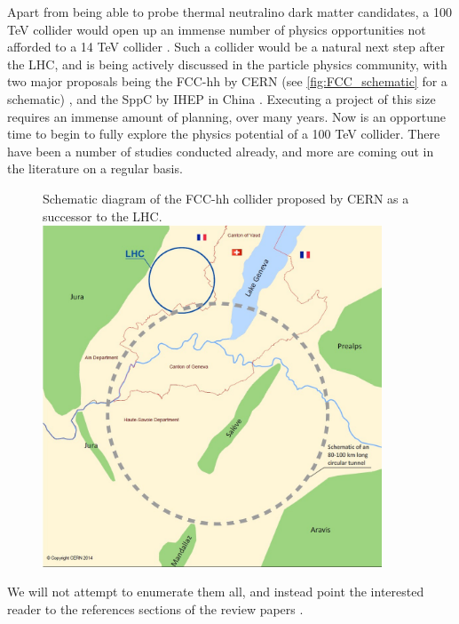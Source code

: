Apart from being able to probe thermal neutralino dark matter candidates, a 100 TeV collider would open up an immense number of physics opportunities not afforded to a 14 TeV collider \citep{Arkani-Hamed2015}. 
Such a collider would be a natural next step after the LHC, and is being actively discussed in the particle physics community, with two major proposals being the FCC-hh by CERN (see \autoref{fig:FCC_schematic} for a schematic) \citep{FCC-hh}, and the SppC by IHEP in China \citep{CEPC}. Executing a project of this size requires an immense amount of planning, over many years. Now is an opportune time to begin to fully explore the physics potential of a 100 TeV collider. There have been a number of studies conducted already, and more are coming out in the literature on a regular basis. 

\begin{figure}[h]
  \begin{sidecaption}
    {Schematic diagram of the FCC-hh collider proposed by CERN as a successor to the LHC.}
    \centering
  \includegraphics[width=0.9\textwidth]{images/FCC_ring_schematic}
  \end{sidecaption}
  \label{fig:FCC_schematic}
\end{figure}

We will not attempt to enumerate them all, and instead point the interested reader to the references sections of the review papers \citep{Arkani-Hamed2015,Contino:2016spe,Golling:2016gvc,Mangano:2016jyj}.

